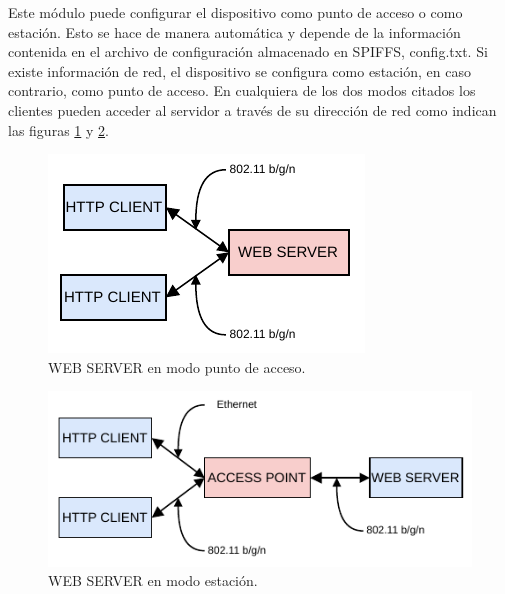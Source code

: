 Este módulo puede configurar el dispositivo como punto de acceso o como estación. Esto se hace de manera automática y depende de la información contenida en el archivo de configuración almacenado en SPIFFS, config.txt. Si existe información de red, el dispositivo se configura como estación, en caso contrario, como punto de acceso. En cualquiera de los dos modos citados los clientes pueden acceder al servidor a través de su dirección de red como indican las figuras \ref{fig:serverAP} y \ref{fig:serverSTA}.                                                                                                                                                                                                                                                                                                                                                                                                                                                                                                                                                                                                                                                                                                                                                                                                                                                                                                                                                                                                                                                                          

\begin{figure}[h]
	\centering
	\includegraphics[scale=1.1]{./Figures/web_server_ap.pdf}
	\caption{WEB SERVER en modo punto de acceso.}
		\label{fig:serverAP}
\end{figure}

\begin{figure}[h]
	\centering
	\includegraphics[scale=1.1]{./Figures/web_server_sta.pdf}
	\caption{WEB SERVER en modo estación.}
		\label{fig:serverSTA}
\end{figure}

